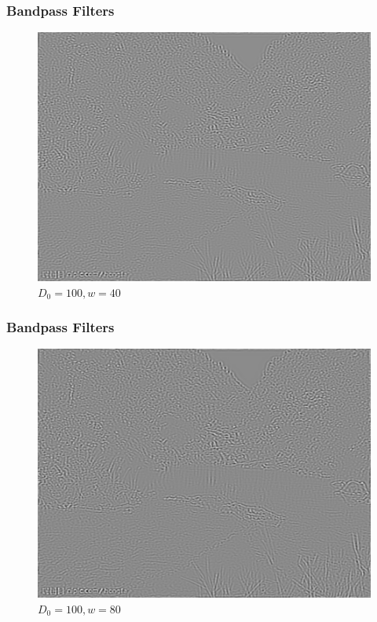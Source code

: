 \documentclass[notheorems, serif, table, compress]{beamer}  %
\begin{document}
\begin{frame}
\frametitle{Bandpass Filters}%
\begin{figure}
 \centering
 \caption{$D_{0}=100,w=40$}%
 \includegraphics[width=0.8\linewidth]{w40bandpass.png} 
 \end{figure}
\end{frame}

\begin{frame}
\frametitle{Bandpass Filters}%
\begin{figure}
 \centering
 \caption{$D_{0}=100,w=80$}%
 \includegraphics[width=0.8\linewidth]{w80bandpass.png} 
 \end{figure}
\end{frame}
\end{document}
